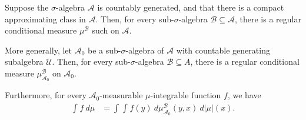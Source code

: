 \documentclass[10pt]{mypackage}
\begin{document}
\begin{theorem}
  Suppose the $\sigma$-algebra $\mathcal{A}$ is countably generated, and that there is a compact approximating class in $\mathcal{A}$. Then, for every sub-$\sigma$-algebra $\mathcal{B}\subseteq \mathcal{A}$, there is a regular conditional measure $\mu^{\mathcal{B}}$ such on $\mathcal{A}$.

  More generally, let $\mathcal{A}_0$ be a sub-$\sigma$-algebra of $\mathcal{A}$ with countable generating subalgebra $\mathcal{U}$. Then, for every sub-$\sigma$-algebra $\mathcal{B}\subseteq A$, there is a regular conditional measure $\mu^{\mathcal{B}}_{\mathcal{A}_0}$ on $\mathcal{A}_0$.

  Furthermore, for every $\mathcal{A}_0$-measurable $\mu$-integrable function $f$, we have
  \begin{align*}
    \int_{}^{} f\:d\mu &= \int_{}^{} \int_{}^{} f\left( y \right)\:d\mu_{\mathcal{A}_0}^{\mathcal{B}}\left( y,x \right)\:d\left\vert \mu \right\vert(x).
  \end{align*}
\end{theorem}
\end{document}
